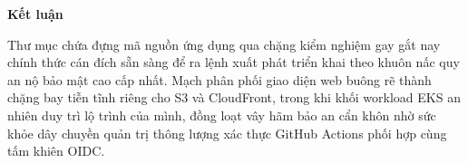 \vspace{0.5em}\noindent\textbf{Kết luận}\par

Thư mục chứa đựng mã nguồn ứng dụng qua chặng kiểm nghiệm gay gắt nay
chính thức cán đích sẵn sàng để ra lệnh xuất phát triển khai theo khuôn
nấc quy an nộ bảo mật cao cấp nhất. Mạch phân phối giao diện web buông
rẽ thành chặng bay tiễn tĩnh riêng cho S3 và CloudFront, trong khi khối
workload EKS an nhiên duy trì lộ trình của mình, đồng loạt vây hãm bảo
an cẩn khôn nhờ sức khỏe dây chuyền quản trị thông lượng xác thực GitHub
Actions phối hợp cùng tấm khiên OIDC.
